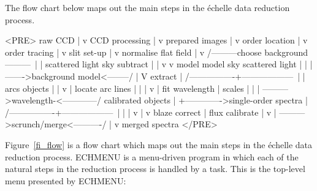\documentclass[twoside,11pt]{article}
\newcommand{\xref}[3]{#1}
\newcommand{\sgspec}[2]{#1}
\newcommand{\sgspec}[2]{#2}
\begin{document}
\begin{htmlonly}
The flow chart below maps out the main steps in the
\'{e}chelle data reduction process.
\begin{rawhtml}
<PRE>
                     raw CCD
                        |
                        v
                  CCD  processing
                        |
                        v
                  prepared images
                        |
                        v
                  order  location
                        |
                        v
                   order tracing
                        |
                        v
                    slit set-up
                        |
                        v
                     normalise
                    flat  field
                        |
                        v
       /---------choose background---------\
       |                                   |
scattered light                      sky  subtract
       |                                   |
       v                                   v
     model                             model sky
scattered light                            |
       |                                   |
       \-------->background  model<--------/
                        |
                        V
                     extract
                        |
       /----------------+------------------\
       |                                   |
      arcs                              objects
       |                                   |
       v                                   |
locate arc lines                           |
       |                                   |
       v                                   |
 fit wavelength                            |
     scales                                |
       |                                   |
       \---------->wavelength-<------------/
               calibrated  objects
                        |
                        +------------->single-order spectra
                        |
       /----------------+------------------\
       |                |                  |
       v                |                  v
 blaze correct          |           flux calibrate
       |                v                  |
       \---------->scrunch/merge<----------/
                        |
                        v
                  merged spectra
</PRE>
\end{rawhtml}
\end{htmlonly}

\sgspec{Figure~\ref{fi_flow} is a flow chart which maps out the main steps
in the \'{e}chelle data reduction process.}{}
\xref{ECHMENU}{sun152}{ECHMENU} is a menu-driven program in which each of
the natural steps in the reduction process is handled by a task.
This is the top-level menu presented by ECHMENU:
\end{document}
